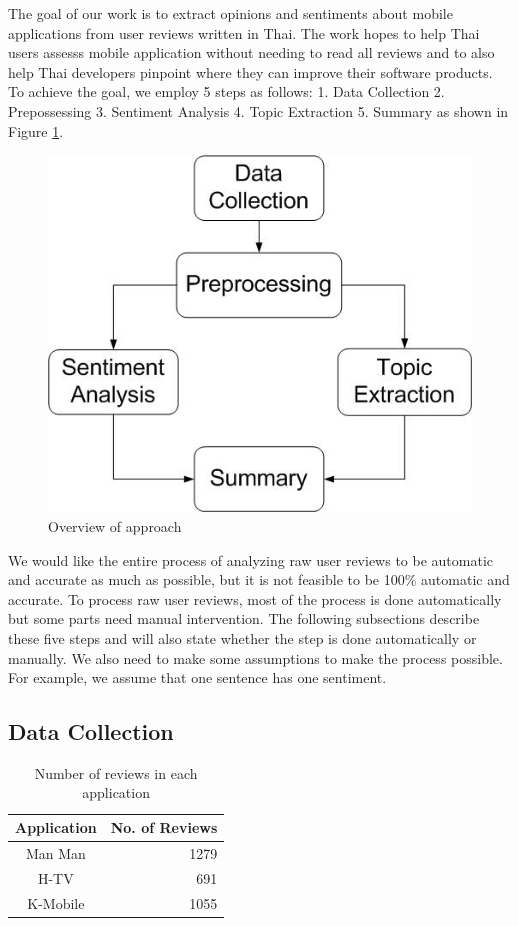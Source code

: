 
The goal of our work is to extract opinions and sentiments about mobile applications from user reviews written in Thai. The work hopes to help Thai users assesss mobile application without needing to read all reviews and to also help Thai developers pinpoint where they can improve their software products. To achieve the goal, we employ 5 steps as follows: 1. Data Collection 2. Prepossessing 3. Sentiment Analysis 4. Topic Extraction 5. Summary as shown in Figure \ref{fig:approachFig}. 

\begin{figure}[h]
	\centering
	\includegraphics[width=.8\linewidth]{Process.jpg}
	\caption{Overview of approach}
	\label{fig:approachFig}
\end{figure}

We would like the entire process of analyzing raw user reviews to be automatic and accurate as much as possible, but it is not feasible to be 100\% automatic and accurate. To process raw user reviews, most of the process is done automatically but some parts need manual intervention. The following subsections describe these five steps and will also state whether the step is done automatically or manually. We also need to make some assumptions to make the process possible. For example, we assume that one sentence has one sentiment.

\subsection{Data Collection}

\begin{table}[h]
	\caption{Number of reviews in each application}
	\label{table:NoOfReview}
	\centering
	\begin{tabular}{|c|r|}
		\hline
		\textbf{Application} & \multicolumn{1}{|c|}{\textbf{No. of Reviews}} \\
		\hline
		Man Man & 1279\\
		\hline
		H-TV & 691\\
		\hline
		K-Mobile & 1055\\
		\hline
	\end{tabular}
\end{table}

